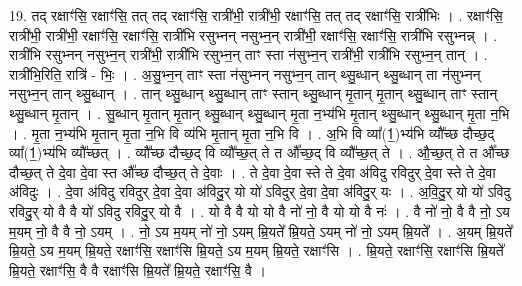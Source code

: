 \documentclass[17pt]{extarticle}
\begin{document}
19. तद् रक्षाꣳ॑सि॒ रक्षाꣳ॑सि॒ तत् तद् रक्षाꣳ॑सि॒ रात्री॑भी॒ रात्री॑भी॒ रक्षाꣳ॑सि॒ तत् तद् रक्षाꣳ॑सि॒ रात्री॑भिः । . रक्षाꣳ॑सि॒ रात्री॑भी॒ रात्री॑भी॒ रक्षाꣳ॑सि॒ रक्षाꣳ॑सि॒ रात्री॑भि रसुभ्नन् नसुभ्न॒न् रात्री॑भी॒ रक्षाꣳ॑सि॒ रक्षाꣳ॑सि॒ रात्री॑भि रसुभ्नन्न् । . रात्री॑भि रसुभ्नन् नसुभ्न॒न् रात्री॑भी॒ रात्री॑भि रसुभ्न॒न् ताꣳ स्ता न॑सुभ्न॒न् रात्री॑भी॒ रात्री॑भि रसुभ्न॒न् तान् । . रात्री॑भि॒रिति॒ रात्रि॑ - भिः॒ । . अ॒सु॒भ्न॒न् ताꣳ स्ता न॑सुभ्नन् नसुभ्न॒न् तान् थ्सु॒ब्धान् थ्सु॒ब्धान् ता न॑सुभ्नन् नसुभ्न॒न् तान् थ्सु॒ब्धान् । . तान् थ्सु॒ब्धान् थ्सु॒ब्धान् ताꣳ स्तान् थ्सु॒ब्धान् मृ॒तान् मृ॒तान् थ्सु॒ब्धान् ताꣳ स्तान् थ्सु॒ब्धान् मृ॒तान् । . सु॒ब्धान् मृ॒तान् मृ॒तान् थ्सु॒ब्धान् थ्सु॒ब्धान् मृ॒ता न॒भ्य॑भि मृ॒तान् थ्सु॒ब्धान् थ्सु॒ब्धान् मृ॒ता न॒भि । . मृ॒ता न॒भ्य॑भि मृ॒तान् मृ॒ता न॒भि वि व्य॑भि मृ॒तान् मृ॒ता न॒भि वि । . अ॒भि वि व्या᳚(1॒)भ्य॑भि व्यौ᳚च्छ दौच्छ॒द् व्या᳚(1॒)भ्य॑भि व्यौ᳚च्छत् । . व्यौ᳚च्छ दौच्छ॒द् वि व्यौ᳚च्छ॒त् ते त औ᳚च्छ॒द् वि व्यौ᳚च्छ॒त् ते । . औ॒च्छ॒त् ते त औ᳚च्छ दौच्छ॒त् ते दे॒वा दे॒वा स्त औ᳚च्छ दौच्छ॒त् ते दे॒वाः । . ते दे॒वा दे॒वा स्ते ते दे॒वा अ॑विदु रविदुर् दे॒वा स्ते ते दे॒वा अ॑विदुः । . दे॒वा अ॑विदु रविदुर् दे॒वा दे॒वा अ॑विदु॒र् यो यो॑ ऽविदुर् दे॒वा दे॒वा अ॑विदु॒र् यः । . अ॒वि॒दु॒र् यो यो॑ ऽविदु रविदु॒र् यो वै वै यो॑ ऽविदु रविदु॒र् यो वै । . यो वै वै यो यो वै नो॑ नो॒ वै यो यो वै नः॑ । . वै नो॑ नो॒ वै वै नो॒ ऽय म॒यम् नो॒ वै वै नो॒ ऽयम् । . नो॒ ऽय म॒यम् नो॑ नो॒ ऽयम् म्रि॒यते᳚ म्रि॒यते॒ ऽयम् नो॑ नो॒ ऽयम् म्रि॒यते᳚ । . अ॒यम् म्रि॒यते᳚ म्रि॒यते॒ ऽय म॒यम् म्रि॒यते॒ रक्षाꣳ॑सि॒ रक्षाꣳ॑सि म्रि॒यते॒ ऽय म॒यम् म्रि॒यते॒ रक्षाꣳ॑सि । . म्रि॒यते॒ रक्षाꣳ॑सि॒ रक्षाꣳ॑सि म्रि॒यते᳚ म्रि॒यते॒ रक्षाꣳ॑सि॒ वै वै रक्षाꣳ॑सि म्रि॒यते᳚ म्रि॒यते॒ रक्षाꣳ॑सि॒ वै । \newline
\end{document}
